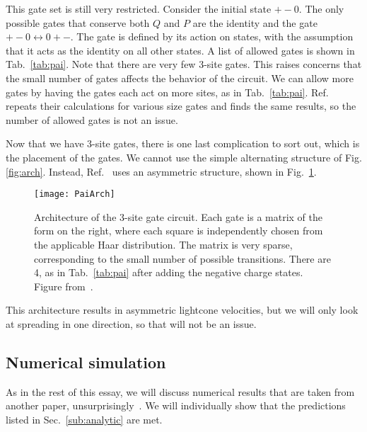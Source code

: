 \documentclass[a4paper,12pt]{article}
\begin{document}
This gate set is still very restricted. Consider the initial state $+-0$. The only possible gates that conserve both $Q$ and $P$ are the identity and the gate $+-0\leftrightarrow 0+-$. The gate is defined by its action on states, with the assumption that it acts as the identity on all other states. A list of allowed gates is shown in Tab.~\ref{tab:pai}. Note that there are very few 3-site gates. This raises concerns that the small number of gates affects the behavior of the circuit. We can allow more gates by having the gates each act on more sites, as in Tab.~\ref{tab:pai}. Ref.~\cite{PaiFracton} repeats their calculations for various size gates and finds the same results, so the number of allowed gates is not an issue.


Now that we have 3-site gates, there is one last complication to sort out, which is the placement of the gates. We cannot use the simple alternating structure of Fig.\ref{fig:arch}. Instead, Ref.~\cite{PaiFracton} uses an asymmetric structure, shown in Fig.~\ref{fig:PaiArch}.
\begin{figure}
	\centering
	\texttt{[image: PaiArch]}
	\caption{Architecture of the 3-site gate circuit. Each gate is a matrix of the form on the right, where each square is independently chosen from the applicable Haar distribution. The matrix is very sparse, corresponding to the small number of possible transitions. There are 4, as in Tab.~\ref{tab:pai} after adding the negative charge states. Figure from~\cite{PaiFracton}.}
	\label{fig:PaiArch}
\end{figure}
This architecture results in asymmetric lightcone velocities, but we will only look at spreading in one direction, so that will not be an issue.

\subsection{Numerical simulation} \label{sub:numeric}

As in the rest of this essay, we will discuss numerical results that are taken from another paper, unsurprisingly~\cite{PaiFracton}. We will individually show that the predictions listed in Sec.~\ref{sub:analytic} are met.
\end{document}
